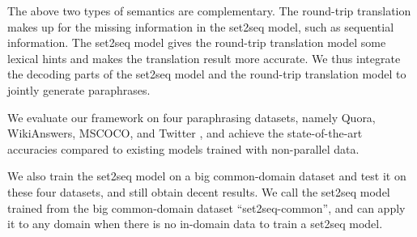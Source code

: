 The above two types of semantics are complementary. The round-trip translation makes 
up for the missing information in the set2seq model, such as sequential information. The set2seq model gives the round-trip translation model some lexical hints 
and makes the translation result more accurate. We thus integrate the decoding parts of 
the set2seq model and the round-trip translation model to jointly generate paraphrases.

We evaluate our framework on four paraphrasing datasets, namely Quora, WikiAnswers, MSCOCO, and Twitter \cite{lan2017continuously}, and achieve the state-of-the-art accuracies compared to existing models trained with non-parallel data. 


We also train the set2seq model on a big common-domain dataset and test it on these four datasets, and still obtain decent results. We call the set2seq model trained from the big common-domain dataset ``set2seq-common'', and can
apply it to any domain when there is no in-domain data to train a set2seq model.


